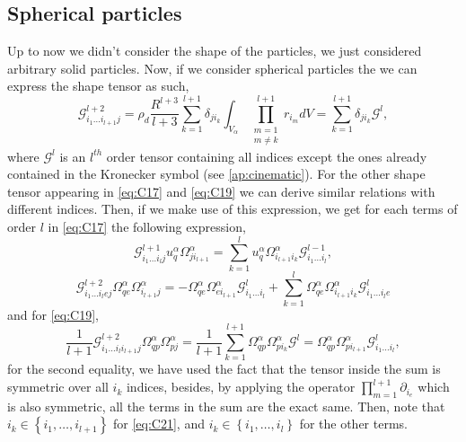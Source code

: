 {\subsection{Spherical particles}
Up to now we didn't consider the shape of the particles, we just considered arbitrary solid particles. 
Now, if we consider spherical particles the we can express the shape tensor as such,
\begin{equation}
    \mathcal{G}_{i_1\ldots i_{l+1}j}^{l+2}
    =\rho_d \frac{R^{l+3}}{l+3}\sum_{k=1}^{l+1} \delta_{j i_k}
    \int_{V_\alpha}  \prod^{l+1}_{\substack{m=1\\ m\neq k}} r_{i_m} dV
    = \sum_{k=1}^{l+1} \delta_{j i_k} \mathcal{G}^l,
\end{equation}
where $\mathcal{G}^l$ is an $l^{th}$ order tensor containing all indices except the ones already contained in the Kronecker symbol (see \ref{ap:cinematic}).
For the other shape tensor appearing in \ref{eq:C17} and \ref{eq:C19} we can derive similar relations with different indices.
Then, if we make use of this expression, we get for each terms of order $l$ in \ref{eq:C17} the following expression,
\begin{equation}
    \mathcal{G}_{i_1\ldots i_l j}^{l+1} u^\alpha_q\Omega_{ji_{l+1}}^\alpha
    = \sum_{k=1}^{l}
    u^\alpha_q\Omega_{i_{l+1}i_k}^\alpha \mathcal{G}^{l-1}_{i_1\ldots i_l},
    \label{eq:C23}
\end{equation}
\begin{equation}
    \mathcal{G}_{i_1\ldots i_l ej}^{l+2}\Omega_{qe}^\alpha \Omega_{i_{l+1}j}^\alpha =
    -\Omega_{qe}^\alpha \Omega_{ei_{l+1}}^\alpha \mathcal{G}^l_{i_1 \ldots i_l}
    +\sum_{k=1}^{l}
    \Omega_{qe}^\alpha \Omega_{i_{l+1}i_k}^\alpha \mathcal{G}^l_{i_1\ldots i_le}
    \label{eq:C24}
\end{equation}
and for \ref{eq:C19},
\begin{equation}
    \frac{1}{l+1}\mathcal{G}_{i_1\ldots i_l i_{l+1}j}^{l+2}\Omega_{qp}^\alpha \Omega_{pj}^\alpha
    =
    \frac{1}{l+1}
    \sum_{k=1}^{l+1}
    \Omega_{qp}^\alpha \Omega_{p i_k}^\alpha \mathcal{G}^l
    =
    \Omega_{qp}^\alpha \Omega_{p i_{l+1}}^\alpha \mathcal{G}^l_{i_1 \ldots i_l},
    \label{eq:C21}
\end{equation}
for the second equality, we have used the fact that the tensor inside the sum is symmetric over all $i_k$ indices, besides, by applying the operator $\prod_{m=1}^{l+1}\partial_{i_e}$ which is also symmetric, all the terms in the sum are the exact same.  
Then, note that $i_k \in \left\{ i_1, \dots, i_{l+1}\right\}$ for \ref{eq:C21},  and $i_k \in \left\{ i_1, \dots, i_{l}\right\}$ for the other terms.
}
